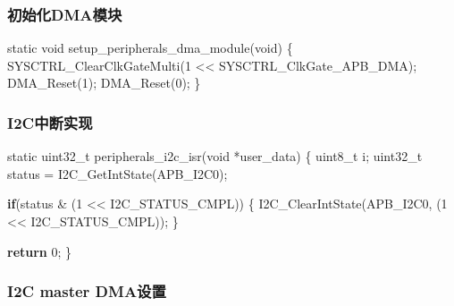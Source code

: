 \documentclass[
  12pt,
]{book}
\newenvironment{Shaded}{\begin{snugshade}}{\end{snugshade}}
\newcommand{\ControlFlowTok}[1]{\textcolor[rgb]{0.13,0.29,0.53}{\textbf{#1}}}
\newcommand{\DataTypeTok}[1]{\textcolor[rgb]{0.13,0.29,0.53}{#1}}
\newcommand{\DecValTok}[1]{\textcolor[rgb]{0.00,0.00,0.81}{#1}}
\newcommand{\NormalTok}[1]{#1}
\begin{document}
\hypertarget{ux521dux59cbux5316dmaux6a21ux5757-2}{%
\subsubsection{初始化DMA模块}\label{ux521dux59cbux5316dmaux6a21ux5757-2}}

\begin{Shaded}
\begin{Highlighting}[]
\DataTypeTok{static} \DataTypeTok{void}\NormalTok{ setup_peripherals_dma_module(}\DataTypeTok{void}\NormalTok{)}
\NormalTok{\{}
\NormalTok{    SYSCTRL_ClearClkGateMulti(}\DecValTok{1}\NormalTok{ << SYSCTRL_ClkGate_APB_DMA);}
\NormalTok{    DMA_Reset(}\DecValTok{1}\NormalTok{);}
\NormalTok{    DMA_Reset(}\DecValTok{0}\NormalTok{);}
\NormalTok{\}}
\end{Highlighting}
\end{Shaded}

\hypertarget{i2cux4e2dux65adux5b9eux73b0-3}{%
\subsubsection{I2C中断实现}\label{i2cux4e2dux65adux5b9eux73b0-3}}

\begin{Shaded}
\begin{Highlighting}[]
\DataTypeTok{static} \DataTypeTok{uint32_t}\NormalTok{ peripherals_i2c_isr(}\DataTypeTok{void}\NormalTok{ *user_data)}
\NormalTok{\{}
  \DataTypeTok{uint8_t}\NormalTok{ i;}
  \DataTypeTok{uint32_t}\NormalTok{ status = I2C_GetIntState(APB_I2C0);}
  
  \ControlFlowTok{if}\NormalTok{(status & (}\DecValTok{1}\NormalTok{ << I2C_STATUS_CMPL))}
\NormalTok{  \{}
\NormalTok{    I2C_ClearIntState(APB_I2C0, (}\DecValTok{1}\NormalTok{ << I2C_STATUS_CMPL));}
\NormalTok{  \}}

  \ControlFlowTok{return} \DecValTok{0}\NormalTok{;}
\NormalTok{\}}
\end{Highlighting}
\end{Shaded}

\hypertarget{i2c-master-dmaux8bbeux7f6e-1}{%
\subsubsection{I2C master DMA设置}\label{i2c-master-dmaux8bbeux7f6e-1}}
\end{document}
